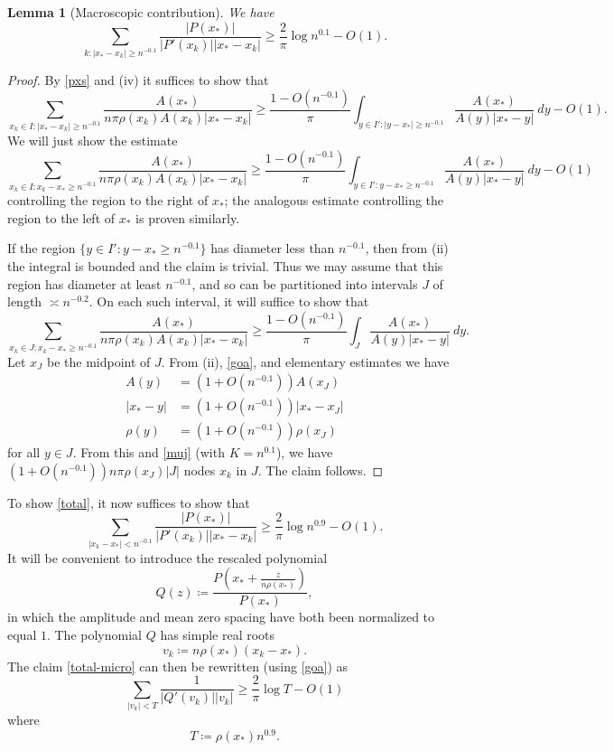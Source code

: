 \documentclass[12pt]{amsart}
\newtheorem{lemma}[theorem]{Lemma}
\begin{document}
\begin{lemma}[Macroscopic contribution]\label{macro}  We have
$$
 \sum_{k: |x_*-x_k| \geq n^{-0.1}} \frac{|P(x_*)|}{|P'(x_k)| |x_*-x_k|} \geq \frac{2}{\pi} \log n^{0.1} - O(1).
$$
\end{lemma}

\begin{proof}
By \eqref{pxs} and (iv) it suffices to show that
$$ \sum_{x_k \in I: |x_* - x_k| \geq n^{-0.1}} \frac{A(x_*)}{n \pi \rho(x_k) A(x_k) |x_*-x_k|} \geq
    \frac{1-O(n^{-0.1})}{\pi} \int_{y \in I': |y-x_*| \geq n^{-0.1}} \frac{A(x_*)}{A(y) |x_*-y|}\ dy - O(1).$$
We will just show the estimate
$$ \sum_{x_k \in I: x_k - x_* \geq n^{-0.1}} \frac{A(x_*)}{n \pi \rho(x_k) A(x_k) |x_*-x_k|} \geq  \frac{1-O(n^{-0.1})}{\pi} \int_{y \in I': y-x_* \geq n^{-0.1}} \frac{A(x_*)}{A(y) |x_*-y|}\ dy - O(1)$$
controlling the region to the right of $x_*$; the analogous estimate controlling the region to the left of $x_*$ is proven similarly.

If the region $\{ y \in I': y - x_* \geq n^{-0.1}\}$ has diameter less than $n^{-0.1}$, then from (ii) the integral is bounded and the claim is trivial.  Thus we may assume that this region has diameter at least $n^{-0.1}$, and so can be partitioned into intervals $J$ of length $\asymp n^{-0.2}$.  On each such interval, it will suffice to show that
$$ \sum_{x_k \in J: x_k - x_* \geq n^{-0.1}} \frac{A(x_*)}{n \pi \rho(x_k) A(x_k) |x_*-x_k|} \geq
    \frac{1-O(n^{-0.1})}{\pi} \int_J \frac{A(x_*)}{A(y) |x_*-y|}\ dy.$$
Let $x_J$ be the midpoint of $J$.  From (ii), \eqref{goa}, and elementary estimates we have
\begin{align*}
A(y) &= (1+O(n^{-0.1})) A(x_J) \\
|x_*-y| &= (1+O(n^{-0.1})) |x_*-x_J| \\
\rho(y) &= (1+O(n^{-0.1})) \rho(x_J)
\end{align*}
for all $y \in J$.  From this and \eqref{muj} (with $K = n^{0.1}$), we have $(1+O(n^{-0.1})) n \pi \rho(x_J) |J|$ nodes $x_k$ in $J$.  The claim follows.
\end{proof}

To show \eqref{total}, it now suffices to show that
\begin{equation}\label{total-micro}
 \sum_{|x_k - x_*| < n^{-0.1}} \frac{|P(x_*)|}{|P'(x_k)| |x_*-x_k|} \geq \frac{2}{\pi} \log n^{0.9} - O(1).
\end{equation}
It will be convenient to introduce the rescaled polynomial
$$ Q(z) \coloneqq \frac{P(x_* + \frac{z}{n \rho(x_*)})}{P(x_*)},$$
in which the amplitude and mean zero spacing have both been normalized to equal $1$.  The polynomial $Q$ has simple real roots
$$ v_k \coloneqq n \rho(x_*) (x_k - x_*).$$
The claim \eqref{total-micro} can then be rewritten (using \eqref{goa}) as
\begin{equation}\label{total-micro-rescaled}
     \sum_{|v_k| < T} \frac{1}{|Q'(v_k)| |v_k|} \geq \frac{2}{\pi} \log T - O(1)
\end{equation}
where
$$ T \coloneqq \rho(x_*) n^{0.9}.$$
\end{document}
